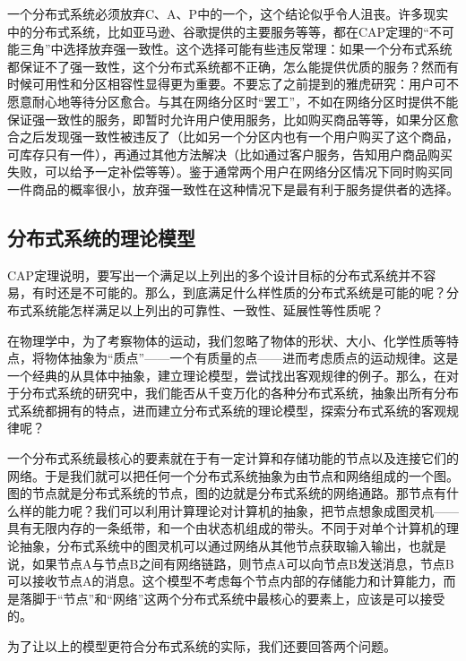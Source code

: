 \documentclass[UTF8,AutoFakeBold=1,AutoFakeSlant,zihao=-4]{cucthesis}
\begin{document}
一个分布式系统必须放弃C、A、P中的一个，这个结论似乎令人沮丧。许多现实中的分布式系统，比如亚马逊、谷歌提供的主要服务等等，都在CAP定理的“不可能三角”中选择放弃强一致性。这个选择可能有些违反常理：如果一个分布式系统都保证不了强一致性，这个分布式系统都不正确，怎么能提供优质的服务？然而有时候可用性和分区相容性显得更为重要。不要忘了之前提到的雅虎研究：用户可不愿意耐心地等待分区愈合。与其在网络分区时“罢工”，不如在网络分区时提供不能保证强一致性的服务，即暂时允许用户使用服务，比如购买商品等等，如果分区愈合之后发现强一致性被违反了（比如另一个分区内也有一个用户购买了这个商品，可库存只有一件），再通过其他方法解决（比如通过客户服务，告知用户商品购买失败，可以给予一定补偿等等）。鉴于通常两个用户在网络分区情况下同时购买同一件商品的概率很小，放弃强一致性在这种情况下是最有利于服务提供者的选择。

\subsection{分布式系统的理论模型}

CAP定理说明，要写出一个满足以上列出的多个设计目标的分布式系统并不容易，有时还是不可能的。那么，到底满足什么样性质的分布式系统是可能的呢？分布式系统能怎样满足以上列出的可靠性、一致性、延展性等性质呢？

在物理学中，为了考察物体的运动，我们忽略了物体的形状、大小、化学性质等特点，将物体抽象为“质点”——一个有质量的点——进而考虑质点的运动规律。这是一个经典的从具体中抽象，建立理论模型，尝试找出客观规律的例子。那么，在对于分布式系统的研究中，我们能否从千变万化的各种分布式系统，抽象出所有分布式系统都拥有的特点，进而建立分布式系统的理论模型，探索分布式系统的客观规律呢？

一个分布式系统最核心的要素就在于有一定计算和存储功能的节点以及连接它们的网络。于是我们就可以把任何一个分布式系统抽象为由节点和网络组成的一个图。图的节点就是分布式系统的节点，图的边就是分布式系统的网络通路。那节点有什么样的能力呢？我们可以利用计算理论对计算机的抽象，把节点想象成图灵机——具有无限内存的一条纸带，和一个由状态机组成的带头。不同于对单个计算机的理论抽象，分布式系统中的图灵机可以通过网络从其他节点获取输入输出，也就是说，如果节点A与节点B之间有网络链路，则节点A可以向节点B发送消息，节点B可以接收节点A的消息。这个模型不考虑每个节点内部的存储能力和计算能力，而是落脚于“节点”和“网络”这两个分布式系统中最核心的要素上，应该是可以接受的。

为了让以上的模型更符合分布式系统的实际，我们还要回答两个问题。
\end{document}
